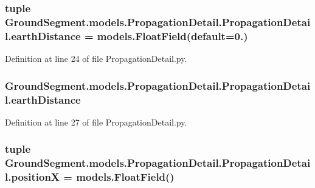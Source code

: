 \subsubsection[{earth\+Distance}]{\setlength{\rightskip}{0pt plus 5cm}tuple Ground\+Segment.\+models.\+Propagation\+Detail.\+Propagation\+Detail.\+earth\+Distance = models.\+Float\+Field(default=0.)\hspace{0.3cm}{\ttfamily [static]}}\label{class_ground_segment_1_1models_1_1_propagation_detail_1_1_propagation_detail_a98f9ff07f0d54a2b315b4ad247c9c4eb}


Definition at line 24 of file Propagation\+Detail.\+py.

\hypertarget{class_ground_segment_1_1models_1_1_propagation_detail_1_1_propagation_detail_ad4ca6c25f7f244d098cb060f2b91571e}{}
\subsubsection[{earth\+Distance}]{\setlength{\rightskip}{0pt plus 5cm}Ground\+Segment.\+models.\+Propagation\+Detail.\+Propagation\+Detail.\+earth\+Distance}\label{class_ground_segment_1_1models_1_1_propagation_detail_1_1_propagation_detail_ad4ca6c25f7f244d098cb060f2b91571e}


Definition at line 27 of file Propagation\+Detail.\+py.

\hypertarget{class_ground_segment_1_1models_1_1_propagation_detail_1_1_propagation_detail_afab79af8d95f0067880b215b7857e000}{}
\subsubsection[{position\+X}]{\setlength{\rightskip}{0pt plus 5cm}tuple Ground\+Segment.\+models.\+Propagation\+Detail.\+Propagation\+Detail.\+position\+X = models.\+Float\+Field()\hspace{0.3cm}{\ttfamily [static]}}\label{class_ground_segment_1_1models_1_1_propagation_detail_1_1_propagation_detail_afab79af8d95f0067880b215b7857e000}



